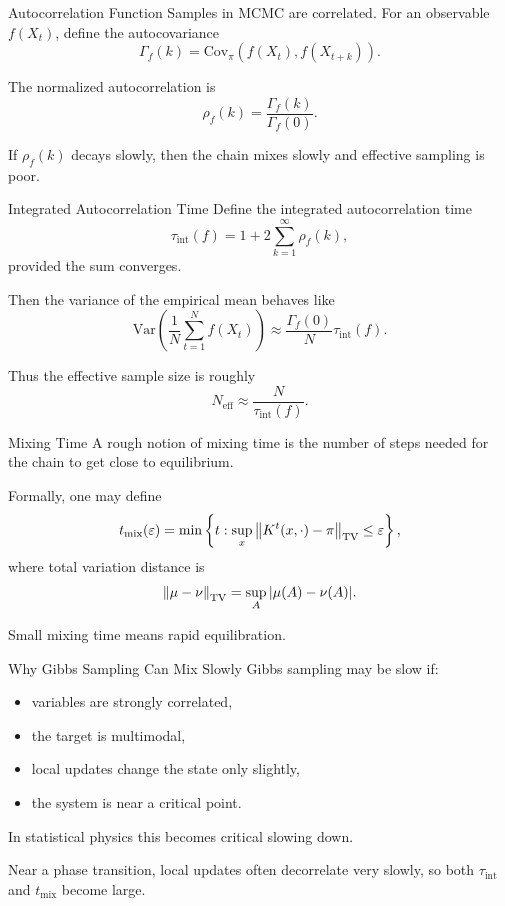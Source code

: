 \documentclass[aspectratio=169]{beamer}
\begin{document}
\begin{frame}{Autocorrelation Function}
Samples in MCMC are correlated. For an observable \(f(X_t)\), define the autocovariance
\[
\Gamma_f(k)=\mathrm{Cov}_\pi(f(X_t),f(X_{t+k})).
\]

The normalized autocorrelation is
\[
\rho_f(k)=\frac{\Gamma_f(k)}{\Gamma_f(0)}.
\]

If \(\rho_f(k)\) decays slowly, then the chain mixes slowly and effective sampling is poor.
\end{frame}

\begin{frame}{Integrated Autocorrelation Time}
Define the integrated autocorrelation time
\[
\tau_{\mathrm{int}}(f)=1+2\sum_{k=1}^{\infty}\rho_f(k),
\]
provided the sum converges.

Then the variance of the empirical mean behaves like
\[
\mathrm{Var}\left(\frac{1}{N}\sum_{t=1}^N f(X_t)\right)
\approx
\frac{\Gamma_f(0)}{N}\tau_{\mathrm{int}}(f).
\]

Thus the effective sample size is roughly
\[
N_{\mathrm{eff}}\approx \frac{N}{\tau_{\mathrm{int}}(f)}.
\]
\end{frame}

\begin{frame}{Mixing Time}
A rough notion of mixing time is the number of steps needed for the chain to get close to equilibrium.

Formally, one may define
\[
t_{\mathrm{mix}}(\varepsilon)
=
\min\left\{
t:\sup_x \norm{K^t(x,\cdot)-\pi}_{\mathrm{TV}}\le \varepsilon
\right\},
\]
where total variation distance is
\[
\norm{\mu-\nu}_{\mathrm{TV}}
=
\sup_A |\mu(A)-\nu(A)|.
\]

Small mixing time means rapid equilibration.
\end{frame}

\begin{frame}{Why Gibbs Sampling Can Mix Slowly}
Gibbs sampling may be slow if:
\begin{itemize}
    \item variables are strongly correlated,
    \item the target is multimodal,
    \item local updates change the state only slightly,
    \item the system is near a critical point.
\end{itemize}

In statistical physics this becomes critical slowing down.

Near a phase transition, local updates often decorrelate very slowly, so both \(\tau_{\mathrm{int}}\) and \(t_{\mathrm{mix}}\) become large.
\end{frame}
\end{document}
